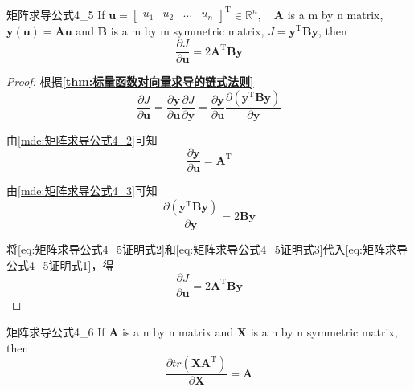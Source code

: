 \documentclass[withoutpreface,bwprint]{NoteBook}
\begin{document}
\begin{matrixDerivativeEquation}
    {}
    {矩阵求导公式4_5}
    If
    $\mathbf{u}=
    \begin{bmatrix}
        u_1 & u_2 & \dots & u_n     
    \end{bmatrix}^\mathrm{T} \in \mathbb{R}^n,\quad \mathbf{A}$ is a m by n matrix, 
    $\mathbf{y}(\mathbf{u})=\mathbf{A}\mathbf{u}$
    and $\mathbf{B}$ is a m by m symmetric matrix, $J=\mathbf{y}^\mathrm{T}\mathbf{B}\mathbf{y}$,
    then
    $$
    \frac{\partial J}{\partial \mathbf{u}}
    =
    2 \mathbf{A}^\mathrm{T} \mathbf{B} \mathbf{y}
    $$
\end{matrixDerivativeEquation}

\begin{proof}
根据\textbf{\cref{thm:标量函数对向量求导的链式法则}}
\begin{equation}
    \label{eq:矩阵求导公式4_5证明式1}
    \frac{\partial J}{\partial \mathbf{u}}
    =
    \frac{\partial \mathbf{y}}{\partial \mathbf{u}} \frac{\partial J}{\partial \mathbf{y}}
    =
    \frac{\partial \mathbf{y}}{\partial \mathbf{u}} \frac{\partial (\mathbf{y}^\mathrm{T}\mathbf{B}\mathbf{y}) }{\partial \mathbf{y}}
\end{equation}

由\cref{mde:矩阵求导公式4_2}可知
\begin{equation}
    \label{eq:矩阵求导公式4_5证明式2}
    \frac{\partial \mathbf{y}}{\partial \mathbf{u}} =\mathbf{A}^\mathrm{T}
\end{equation}

由\cref{mde:矩阵求导公式4_3}可知
\begin{equation}
    \label{eq:矩阵求导公式4_5证明式3}
    \frac{\partial (\mathbf{y}^\mathrm{T}\mathbf{B}\mathbf{y}) }{\partial \mathbf{y}} = 2 \mathbf{B} \mathbf{y}
\end{equation}

将\cref{eq:矩阵求导公式4_5证明式2}和\cref{eq:矩阵求导公式4_5证明式3}代入\cref{eq:矩阵求导公式4_5证明式1}，得
\begin{equation}
    \label{eq:矩阵求导公式4_5证明式4}
    \frac{\partial J}{\partial \mathbf{u}}
    =
    2 \mathbf{A}^\mathrm{T} \mathbf{B} \mathbf{y}
\end{equation}

\end{proof}

\begin{matrixDerivativeEquation}
    {}
    {矩阵求导公式4_6}
    If
    $\mathbf{A}$ is a n by n matrix and 
    $\mathbf{X}$ is a n by n symmetric matrix, then
    $$
    \frac{\partial tr(\mathbf{X}\mathbf{A}^\mathrm{T})}{\partial \mathbf{X}}
    =
    \mathbf{A}
    $$
\end{matrixDerivativeEquation}
\end{document}
